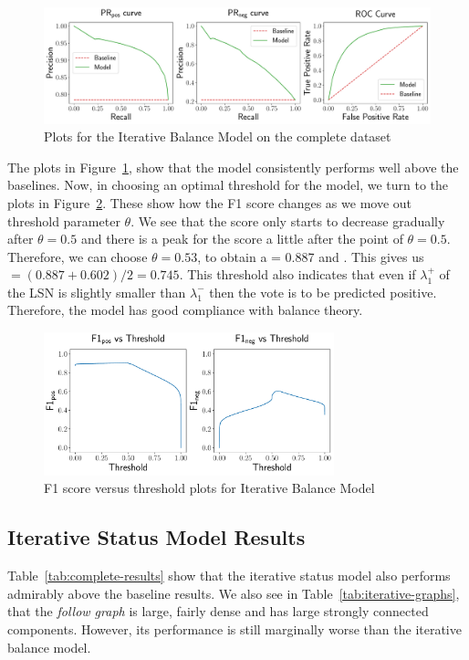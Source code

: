 \begin{figure}[htp]
    \centering
    \includegraphics[width=\textwidth]{images/iterative_Balance.pdf}
    \caption{Plots for the Iterative Balance Model on the complete \wikirfa dataset}
    \label{fig:complete-iterative-balance}
\end{figure}
The plots in Figure~\ref{fig:complete-iterative-balance}, show that the model consistently performs well above the baselines.
Now, in choosing an optimal threshold for the model, we turn to the plots in Figure~\ref{fig:complete-iterative-balance-f1}.
These show how the F1 score changes as we move out threshold parameter $\theta$.
We see that the \posF score only starts to decrease gradually after $\theta=0.5$ and there is a peak for the \negF score a little after the point of $\theta=0.5$.
Therefore, we can choose $\theta=0.53$, to obtain a \posF = 0.887 and .
This gives us \macroF $= (0.887+0.602)/2 = 0.745$.
This threshold also indicates that even if $\lambda_{1}^{+}$ of the LSN is slightly smaller than $\lambda_{1}^{-}$ then the vote is to be predicted positive.
Therefore, the model has good compliance with balance theory.
\begin{figure}[htp]
    \centering
    \includegraphics[width=0.75\textwidth]{images/iterative_Balance_f1.pdf}
    \caption{F1 score versus threshold plots for Iterative Balance Model}
    \label{fig:complete-iterative-balance-f1}
\end{figure}

\subsection{Iterative Status Model Results}
Table~\ref{tab:complete-results} show that the iterative status model also performs admirably above the baseline results.
We also see in Table~\ref{tab:iterative-graphs}, that the \textit{follow graph} is large, fairly dense and has large strongly connected components.
However, its performance is still marginally worse than the iterative balance model.

